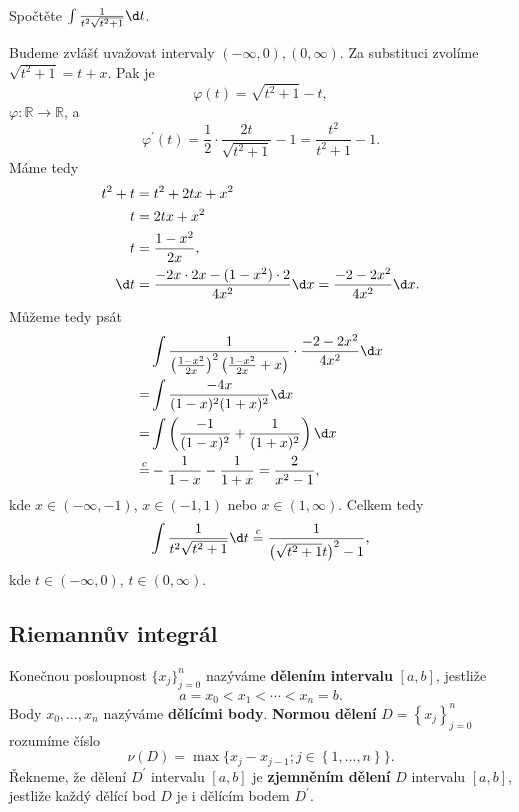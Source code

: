 \begin{priklad}
	Spočtěte $\int \frac{1}{t^2 \sqrt{t^2+1}}\d t$.
	\par Budeme zvlášť uvažovat intervaly $(-\infty, 0), (0, \infty)$. Za substituci zvolíme
	$\sqrt{t^2+1}=t+x$. Pak je
	$$
	    \varphi(t) = \sqrt{t^2+1}-t,
	$$
	$\varphi: \mathbb R \to \mathbb R $, a
	$$
	    \varphi^\prime(t) = \frac{1}{2}\cdot \frac{2t}{\sqrt{t^2+1}} - 1 = \frac{t^2}{t^2+1}-1.
	$$
	Máme tedy
	\begin{align*}
		t^2+t &= t^2+2tx+ x^2 \\
		t &= 2tx +x^2\\
		t &= \frac{1-x^2}{2x},\\
		\d t &= \frac{-2x\cdot 2x - (1-x^2)\cdot 2}{4x^2}\d x = \frac{-2-2x^2}{4x^2} \d x.
	\end{align*}
	Můžeme tedy psát
	\begin{align*}
	&\int \frac{1}{\left( \frac{1-x^2}{2x} \right )^2 \left( \frac{1-x^2}{2x}+x \right )  } \cdot \frac{-2-2x^2}{4x^2}\d x\\
	=&\int \frac{-4x}{(1-x)^2(1+x)^2}\d x \\
	=& \int \left( \frac{-1}{(1-x)^2}+\frac{1}{(1+x)^2} \right )\d x \\
	\stackrel{c}{=}& -\frac{1}{1-x} - \frac{1}{1+x} = \frac{2}{x^2-1},
	\end{align*}
	kde $x \in (-\infty, -1)$, $x \in (-1,1)$ nebo $x\in (1,\infty)$.
	Celkem tedy
	$$
	    \int \frac{1}{t^2 \sqrt{t^2+1}}\d t \stackrel{c}{=} \frac{1}{\left( \sqrt{t^2+1}t \right )^2 - 1 },
	$$
	kde $t \in (-\infty, 0)$, $t \in (0, \infty)$.
\end{priklad}

\subsection{Riemannův integrál}
\begin{definice}
Konečnou posloupnost $\{x_j\}_{j=0}^n$ nazýváme \textbf{dělením intervalu} $[a,b]$, jestliže
\[
a = x_0 < x_1 < \cdots < x_n = b.
\]
Body $x_0,\dots,x_n$ nazýváme \textbf{dělícími body}. \textbf{Normou dělení} $D=\left \{ x_j \right \}_{j=0}^n $
rozumíme číslo
\[
\nu(D) = \max \{x_j - x_{j-1}; j\in \left \{ 1,\dots,n \right \} \}.
\]
Řekneme, že dělení $D^\prime$ intervalu $[a,b]$ je \textbf{zjemněním dělení} $D$ intervalu $[a,b]$,
jestliže každý dělící bod $D$ je i dělícím bodem $D^\prime$.
\end{definice}

